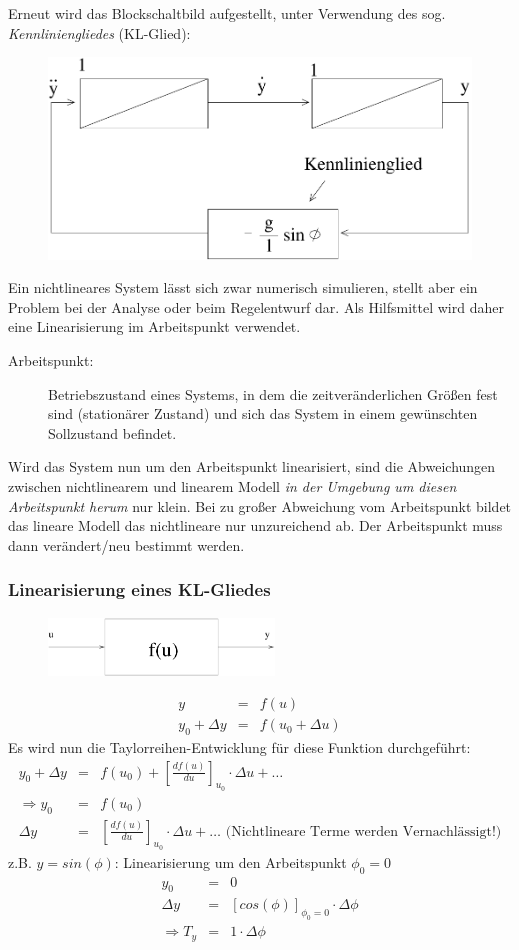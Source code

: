 \documentclass[12pt,a4paper,ngerman]{scrartcl}
\begin{document}
Erneut wird das Blockschaltbild aufgestellt, unter Verwendung des sog. \emph{Kennliniengliedes} (KL-Glied):

\begin{figure}[H]
  \centering
  \includegraphics[width=.5\linewidth]{sysregel_bsb4}
\end{figure}

Ein nichtlineares System lässt sich zwar numerisch simulieren, stellt aber ein Problem bei der Analyse oder beim Regelentwurf dar. Als Hilfsmittel wird daher eine Linearisierung im Arbeitspunkt verwendet.
\begin{description}
\item[Arbeitspunkt: ]Betriebszustand eines Systems, in dem die zeitveränderlichen Größen fest sind (stationärer Zustand) und sich das System in einem gewünschten Sollzustand befindet. 
\end{description}
Wird das System nun um den Arbeitspunkt linearisiert, sind die Abweichungen zwischen nichtlinearem und linearem Modell \emph{in der Umgebung um diesen Arbeitspunkt herum }nur klein. Bei zu großer Abweichung vom Arbeitspunkt bildet das lineare Modell das nichtlineare nur unzureichend ab. Der Arbeitspunkt muss dann verändert/neu bestimmt werden. 

\subsubsection*{Linearisierung eines KL-Gliedes}
\begin{figure}[H]
\center
  \includegraphics[width=6cm]{sysregel_klglied}
\end{figure}

\begin{eqnarray*}
  y&=&f(u) \\
y_0+ \Delta y &=& f(u_0+ \Delta u)
\end{eqnarray*}
Es wird nun die Taylorreihen-Entwicklung für diese Funktion durchgeführt:
\begin{eqnarray*}
  y_0+\Delta y &=& f(u_0) + [\frac{df(u)}{du}]_{u_0} \cdot \Delta u + \dots\\
  \Rightarrow y_0& =& f(u_0)\\ \Delta y &=&[\frac{df(u)}{du}]_{u_0} \cdot \Delta u + \dots \text{ (Nichtlineare Terme werden Vernachlässigt!)}
\end{eqnarray*}
z.B. $y=sin(\phi)$: Linearisierung um den Arbeitspunkt $\phi_0 =0$
\begin{eqnarray*}
y_0 &=& 0\\
\Delta y&=& [cos(\phi)]_{\phi_0 =0} \cdot \Delta \phi\\
\Rightarrow T_y &=& 1 \cdot \Delta \phi 
\end{eqnarray*}
\end{document}
